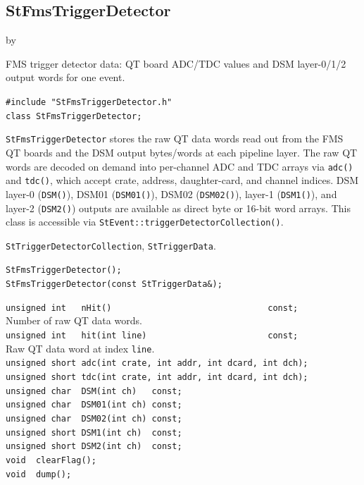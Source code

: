 \documentclass[twoside]{article}
\newcommand{\entrylabel}[1]{\mbox{\textbf{{#1}}}\hfil}%
\newenvironment{entry}
{\begin{list}{}%
    {\renewcommand{\makelabel}{\entrylabel}%
     \setlength{\labelwidth}{90pt}%
     \setlength{\leftmargin}{\labelwidth}
     \advance\leftmargin by \labelsep%
      }%
    }%
  {\end{list}}
\newcommand{\Entrylabel}[1]%
{\raisebox{0pt}[1ex][0pt]{\makebox[\labelwidth][l]%
    {\parbox[t]{\labelwidth}{\hspace{0pt}\textbf{{#1}}}}}}
\newenvironment{Entry}%
{\renewcommand{\entrylabel}{\Entrylabel}\begin{entry}}%
  {\end{entry}}
\begin{document}
\subsection{StFmsTriggerDetector}
\label{sec:StFmsTriggerDetector}
\begin{Entry}
\item[Summary]
    FMS trigger detector data: QT board ADC/TDC values and DSM layer-0/1/2
    output words for one event.

\item[Synopsis]
    \verb+#include "StFmsTriggerDetector.h"+\\
    \verb+class StFmsTriggerDetector;+\\

\item[Description]
    \texttt{StFmsTriggerDetector} stores the raw QT data words read out
    from the FMS QT boards and the DSM output bytes/words at each pipeline
    layer.  The raw QT words are decoded on demand into per-channel ADC and
    TDC arrays via \texttt{adc()} and \texttt{tdc()}, which accept
    crate, address, daughter-card, and channel indices.  DSM layer-0
    (\texttt{DSM()}), DSM01 (\texttt{DSM01()}), DSM02 (\texttt{DSM02()}),
    layer-1 (\texttt{DSM1()}), and layer-2 (\texttt{DSM2()}) outputs are
    available as direct byte or 16-bit word arrays.
    This class is accessible via \texttt{StEvent::triggerDetectorCollection()}.

\item[Related Classes]
    \texttt{StTriggerDetectorCollection}, \texttt{StTriggerData}.

\item[Public\\ Constructors]
    \verb+StFmsTriggerDetector();+\\
    \verb+StFmsTriggerDetector(const StTriggerData&);+\\

\item[Public Member\\ Functions]
    \verb+unsigned int   nHit()                               const;+\\
        Number of raw QT data words.\\
    \verb+unsigned int   hit(int line)                        const;+\\
        Raw QT data word at index \verb+line+.\\
    \verb+unsigned short adc(int crate, int addr, int dcard, int dch);+\\
    \verb+unsigned short tdc(int crate, int addr, int dcard, int dch);+\\
    \verb+unsigned char  DSM(int ch)   const;+\\
    \verb+unsigned char  DSM01(int ch) const;+\\
    \verb+unsigned char  DSM02(int ch) const;+\\
    \verb+unsigned short DSM1(int ch)  const;+\\
    \verb+unsigned short DSM2(int ch)  const;+\\
    \verb+void  clearFlag();+\\
    \verb+void  dump();+\\
\end{Entry}
\end{document}
